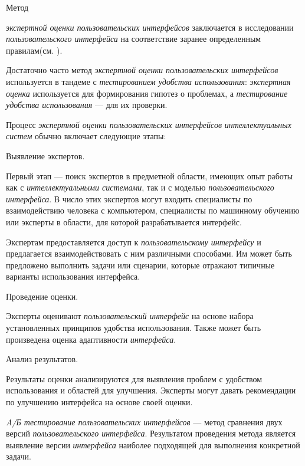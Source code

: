 Метод {\textit{экспертной оценки пользовательских интерфейсов} заключается в исследовании \textit{пользовательского интерфейса} на соответствие заранее определенным правилам(см. ).

Достаточно часто метод \textit{экспертной оценки пользовательских интерфейсов} используется в тандеме с \textit{тестированием удобства использования}: \textit{экспертная оценка} используется для формирования гипотез о проблемах, а \textit{тестирование удобства использования} --- для их проверки.

Процесс \textit{экспертной оценки пользовательских интерфейсов} \textit{интеллектуальных систем} обычно включает следующие этапы:

\begin{textitemize}
\item Выявление экспертов. 

Первый этап --- поиск экспертов в предметной области, имеющих опыт работы как с \textit{интеллектуальными системами}, так и с моделью \textit{пользовательского интерфейса}. В число этих экспертов могут входить специалисты по взаимодействию человека с компьютером, специалисты по машинному обучению или эксперты в области, для которой разрабатывается интерфейс.

Экспертам предоставляется доступ к \textit{пользовательскому интерфейсу} и предлагается взаимодействовать с ним различными способами. Им может быть предложено выполнить задачи или сценарии, которые отражают типичные варианты использования интерфейса.

\item Проведение оценки. 

Эксперты оценивают \textit{пользовательский интерфейс} на основе набора установленных принципов удобства использования. Также может быть произведена оценка адаптивности \textit{интерфейса}.

\item Анализ результатов. 

Результаты оценки анализируются для выявления проблем с удобством использования и областей для улучшения. Эксперты могут давать рекомендации по улучшению интерфейса на основе своей оценки.
\end{textitemize}

\textit{A/Б тестирование пользовательских интерфейсов} --- метод сравнения двух версий \textit{пользовательского интерфейса}. Результатом проведения метода является выявление версии \textit{интерфейса} наиболее подходящей для выполнения конкретной задачи.

}
